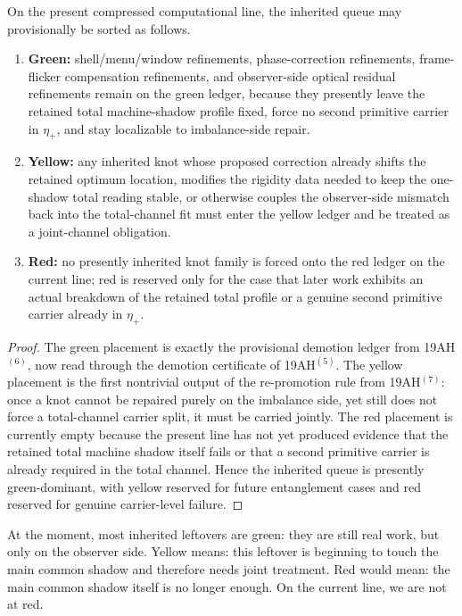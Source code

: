 \begin{proposition}
On the present compressed computational line, the inherited queue may provisionally be sorted as follows.
\begin{enumerate}[leftmargin=2em]
  \item \textbf{Green:} shell/menu/window refinements, phase-correction refinements, frame-flicker compensation refinements, and observer-side optical residual refinements remain on the green ledger, because they presently leave the retained total machine-shadow profile fixed, force no second primitive carrier in \(\eta_+\), and stay localizable to imbalance-side repair.
  \item \textbf{Yellow:} any inherited knot whose proposed correction already shifts the retained optimum location, modifies the rigidity data needed to keep the one-shadow total reading stable, or otherwise couples the observer-side mismatch back into the total-channel fit must enter the yellow ledger and be treated as a joint-channel obligation.
  \item \textbf{Red:} no presently inherited knot family is forced onto the red ledger on the current line; red is reserved only for the case that later work exhibits an actual breakdown of the retained total profile or a genuine second primitive carrier already in \(\eta_+\).
\end{enumerate}
\end{proposition}

\begin{proof}
The green placement is exactly the provisional demotion ledger from 19AH$^{(6)}$, now read through the demotion certificate of 19AH$^{(5)}$. The yellow placement is the first nontrivial output of the re-promotion rule from 19AH$^{(7)}$: once a knot cannot be repaired purely on the imbalance side, yet still does not force a total-channel carrier split, it must be carried jointly. The red placement is currently empty because the present line has not yet produced evidence that the retained total machine shadow itself fails or that a second primitive carrier is already required in the total channel. Hence the inherited queue is presently green-dominant, with yellow reserved for future entanglement cases and red reserved for genuine carrier-level failure.
\end{proof}

\begin{corollary}
At the moment, most inherited leftovers are green: they are still real work, but only on the observer side. Yellow means: this leftover is beginning to touch the main common shadow and therefore needs joint treatment. Red would mean: the main common shadow itself is no longer enough. On the current line, we are not at red.
\end{corollary}

